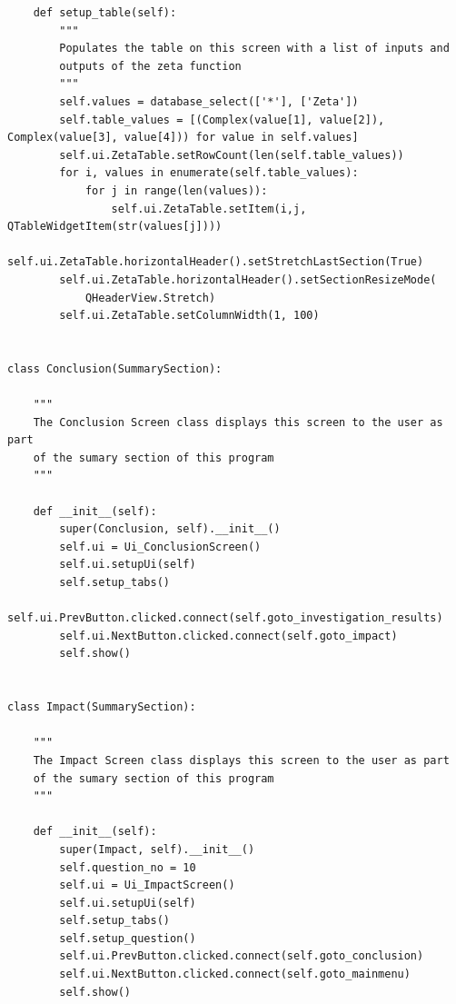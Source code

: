\documentclass{article}
\begin{document}
\begin{lstlisting}
    def setup_table(self):
        """
        Populates the table on this screen with a list of inputs and
        outputs of the zeta function
        """
        self.values = database_select(['*'], ['Zeta'])
        self.table_values = [(Complex(value[1], value[2]), Complex(value[3], value[4])) for value in self.values]
        self.ui.ZetaTable.setRowCount(len(self.table_values))
        for i, values in enumerate(self.table_values):
            for j in range(len(values)):
                self.ui.ZetaTable.setItem(i,j, QTableWidgetItem(str(values[j])))
        self.ui.ZetaTable.horizontalHeader().setStretchLastSection(True)
        self.ui.ZetaTable.horizontalHeader().setSectionResizeMode(
            QHeaderView.Stretch)
        self.ui.ZetaTable.setColumnWidth(1, 100)


class Conclusion(SummarySection):

    """
    The Conclusion Screen class displays this screen to the user as part
    of the sumary section of this program
    """

    def __init__(self):
        super(Conclusion, self).__init__()
        self.ui = Ui_ConclusionScreen()
        self.ui.setupUi(self)
        self.setup_tabs()
        self.ui.PrevButton.clicked.connect(self.goto_investigation_results)
        self.ui.NextButton.clicked.connect(self.goto_impact)
        self.show()


class Impact(SummarySection):

    """
    The Impact Screen class displays this screen to the user as part
    of the sumary section of this program
    """

    def __init__(self):
        super(Impact, self).__init__()
        self.question_no = 10
        self.ui = Ui_ImpactScreen()
        self.ui.setupUi(self)
        self.setup_tabs()
        self.setup_question()
        self.ui.PrevButton.clicked.connect(self.goto_conclusion)
        self.ui.NextButton.clicked.connect(self.goto_mainmenu)
        self.show()
\end{lstlisting}
\end{document}
